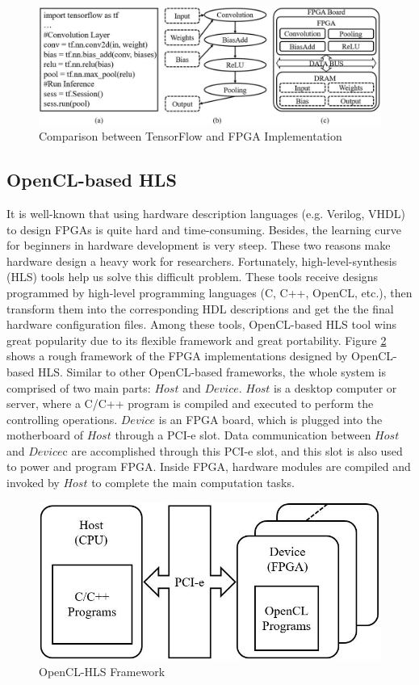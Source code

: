 \documentclass{acm_proc_article-sp-copy}
\begin{document}
\begin{figure}
	\centering
	\includegraphics[width=1.0\linewidth]{./figure/tf.jpg}
	\caption{Comparison between TensorFlow and FPGA Implementation}
	\label{tf}
\end{figure}

\subsection{OpenCL-based HLS}
It is well-known that using hardware description languages (e.g. Verilog, VHDL) to design FPGAs is quite hard and time-consuming. Besides, the learning curve for beginners in hardware development is very steep. These two reasons make hardware design a heavy work for researchers. Fortunately, high-level-synthesis (HLS) tools help us solve this difficult problem. These tools receive designs programmed by high-level programming languages (C, C++, OpenCL, etc.), then transform them into the corresponding HDL descriptions and get the the final hardware configuration files. Among these tools, OpenCL-based HLS tool wins great popularity due to its flexible framework and great portability. Figure \ref{OpenCL-HLS} shows a rough framework of the FPGA implementations designed by OpenCL-based HLS. Similar to other OpenCL-based frameworks, the whole system is comprised of two main parts: $Host$ and $Device$. $Host$ is a desktop computer or server, where a C/C++ program is compiled and executed to perform the controlling operations. $Device$ is an FPGA board, which is plugged into the motherboard of $Host$ through a PCI-e slot. Data communication between $Host$ and $Device$c are accomplished through this PCI-e slot, and this slot is also used to power and program FPGA. Inside FPGA, hardware modules are compiled and invoked by $Host$ to complete the main computation tasks.

\begin{figure}
\centering
\includegraphics[width=1.0\linewidth]{./figure/OpenCL-HLS.jpg}
\caption{OpenCL-HLS Framework}
\label{OpenCL-HLS}
\end{figure}
\end{document}
